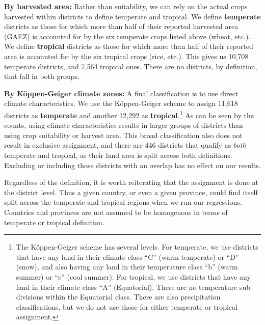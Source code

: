 \documentclass[11pt]{article}
\begin{document}
\vspace{.5cm}\noindent\textbf{By harvested area:} Rather than suitability, we can rely on the actual crops harvested within districts to define temperate and tropical. We define \textbf{temperate} districts as those for which more than half of their reported harvested area (GAEZ) is accounted for by the six temperate crops listed above (wheat, etc.). We define \textbf{tropical} districts as those for which more than half of their reported area is accounted for by the six tropical crops (rice, etc.). This gives us 10,708 temperate districts, and 7,564 tropical ones. There are no districts, by definition, that fall in both groups.

\vspace{.5cm}\noindent\textbf{By K{\"o}ppen-Geiger climate zones:} A final classification is to use direct climate characteristics. We use the K{\"o}ppen-Geiger scheme to assign 11,618 districts as \textbf{temperate} and another 12,292 as \textbf{tropical}.\footnote{The K{\"o}ppen-Geiger scheme has several levels. For temperate, we use districts that have any land in their climate class ``C'' (warm temperate) or ``D'' (snow), and also having any land in their temperature class ``b'' (warm summer) or ``c'' (cool summer). For tropical, we use districts that have any land in their climate class ``A'' (Equatorial). There are no temperature sub-divisions within the Equatorial class. There are also precipitation classifications, but we do not use those for either temperate or tropical assignment.} As can be seen by the counts, using climate characteristics results in larger groups of districts than using crop suitability or harvest area. This broad classification also does not result in exclusive assignment, and there are 446 districts that qualify as \textit{both} temperate and tropical, as their land area is split across both definitions. Excluding or including those districts with an overlap has no effect on our results.

\vspace{.5cm} 
Regardless of the definition, it is worth reiterating that the assignment is done at the district level. Thus a given country, or even a given province, could find itself split across the temperate and tropical regions when we run our regressions. Countries and provinces are not assumed to be homogenous in terms of temperate or tropical definition.
\end{document}
